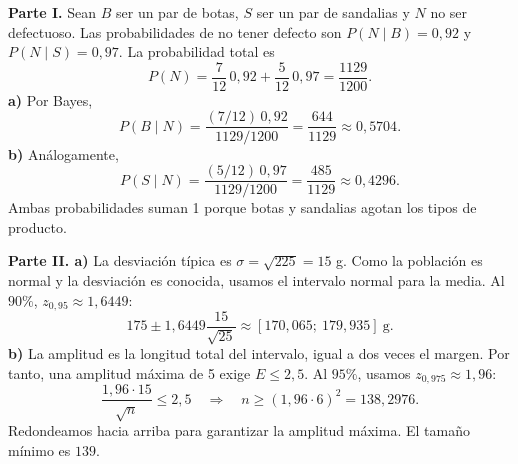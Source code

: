 \textbf{Parte I.} Sean $B$ ser un par de botas, $S$ ser un par de sandalias y $N$ no ser defectuoso. Las probabilidades de no tener defecto son $P(N\mid B)=0{,}92$ y $P(N\mid S)=0{,}97$. La probabilidad total es
\[
 P(N)=\frac7{12}\,0{,}92+\frac5{12}\,0{,}97
     =\frac{1129}{1200}.
\]
\textbf{a)} Por Bayes,
\[
 P(B\mid N)=\frac{(7/12)\,0{,}92}{1129/1200}
 =\boxed{\frac{644}{1129}}\approx0{,}5704.
\]
\textbf{b)} Análogamente,
\[
 P(S\mid N)=\frac{(5/12)\,0{,}97}{1129/1200}
 =\boxed{\frac{485}{1129}}\approx0{,}4296.
\]
Ambas probabilidades suman 1 porque botas y sandalias agotan los tipos de producto.

\textbf{Parte II. a)} La desviación típica es $\sigma=\sqrt{225}=15$ g. Como la población es normal y la desviación es conocida, usamos el intervalo normal para la media. Al $90\%$, $z_{0{,}95}\approx1{,}6449$:
\[
 175\pm1{,}6449\frac{15}{\sqrt{25}}
 \approx\boxed{[170{,}065;\ 179{,}935]}\ \text{g}.
\]
\textbf{b)} La amplitud es la longitud total del intervalo, igual a dos veces el margen. Por tanto, una amplitud máxima de 5 exige $E\le2{,}5$. Al $95\%$, usamos $z_{0{,}975}\approx1{,}96$:
\[
 \frac{1{,}96\cdot15}{\sqrt n}\le2{,}5
 \quad\Longrightarrow\quad n\ge(1{,}96\cdot6)^2=138{,}2976.
\]
Redondeamos hacia arriba para garantizar la amplitud máxima. El tamaño mínimo es $\boxed{139}$.
